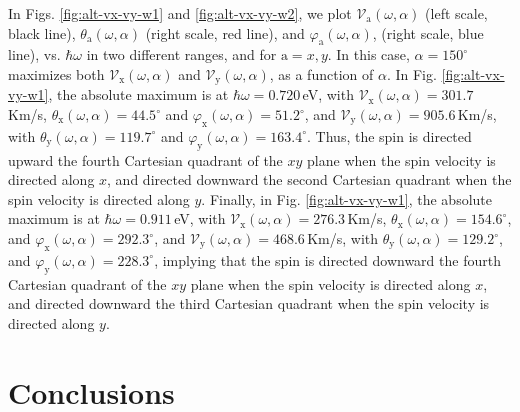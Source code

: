 \documentclass[floatfix,prb,aps,superscriptaddress,showpacs,11pt,preprint,letterpaper]{revtex4}
\begin{document}
In Figs. \ref{fig:alt-vx-vy-w1} and \ref{fig:alt-vx-vy-w2}, we plot
$\mathcal{V}_{\mathrm{a}} (\omega,\alpha)$ (left scale, black line),
$\theta_{\mathrm{a}} (\omega,\alpha)$ (right scale, red line), and
$\varphi_{\mathrm{a}} (\omega,\alpha)$, (right scale, blue line), vs.
$\hbar\omega$ in two different ranges, and  for $\mathrm{a} =x,y$. In this case,
$\alpha=150^\circ$  maximizes both $\mathcal{V}_{\mathrm{x}} (\omega,\alpha)$
and $\mathcal{V}_{\mathrm{y}} (\omega,\alpha)$, as a function of $\alpha$. In
Fig. \ref{fig:alt-vx-vy-w1}, the absolute maximum is at $\hbar\omega=0.720$\,eV,
with $\mathcal{V}_{\mathrm{x}} (\omega,\alpha) = 301.7$\,Km/s,
$\theta_{\mathrm{x}} (\omega,\alpha) = 44.5^{\circ}$ and
$\varphi_{\mathrm{x}}(\omega,\alpha) = 51.2^{\circ}$, and
$\mathcal{V}_{\mathrm{y}} (\omega,\alpha) = 905.6$\,Km/s, with
$\theta_{\mathrm{y}} (\omega,\alpha) = 119.7^{\circ}$ and
$\varphi_{\mathrm{y}}(\omega,\alpha) = 163.4^{\circ}$. Thus, the spin is
directed upward the fourth Cartesian quadrant of the $xy$ plane when the spin
velocity is directed along $x$, and directed downward the second Cartesian
quadrant when the spin velocity is directed along $y$. Finally, in  Fig.
\ref{fig:alt-vx-vy-w1}, the absolute maximum is at $\hbar\omega=0.911$\,eV, with
$\mathcal{V}_{\mathrm{x}} (\omega,\alpha) = 276.3$\,Km/s, $\theta_{\mathrm{x}}
(\omega,\alpha) = 154.6^{\circ}$, and $\varphi_{\mathrm{x}}(\omega,\alpha) =
292.3^{\circ}$, and $\mathcal{V}_{\mathrm{y}} (\omega,\alpha) = 468.6$\,Km/s,
with $\theta_{\mathrm{y}} (\omega,\alpha) = 129.2^{\circ}$, and
$\varphi_{\mathrm{y}}(\omega,\alpha) = 228.3^{\circ}$, implying that the spin is
directed downward the fourth Cartesian quadrant of the $xy$ plane when the spin
velocity is directed along $x$, and directed downward the third Cartesian
quadrant when the spin velocity is directed along $y$.

\section{Conclusions} %
\label{sec:conclusions}
\end{document}
